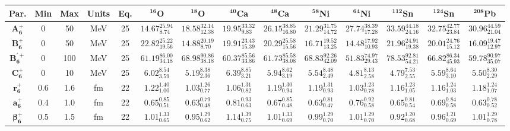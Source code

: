 \bgroup
\def\arraystretch{1.5}%
\begin{tabular}{ c c c c c c c c c c c c c c} 
\textbf{Par.} & \textbf{Min} & \textbf{Max} &                \textbf{Units} & \textbf{Eq.}& \textbf{$\mathbf{^{16}}$O}& \textbf{$\mathbf{^{18}}$O}& \textbf{$\mathbf{^{40}}$Ca}& \textbf{$\mathbf{^{48}}$Ca}& \textbf{$\mathbf{^{58}}$Ni}& \textbf{$\mathbf{^{64}}$Ni}& \textbf{$\mathbf{^{112}}$Sn}& \textbf{$\mathbf{^{124}}$Sn}& \textbf{$\mathbf{^{208}}$Pb}\\
 \hline 
$\mathbf{A_{6}^{+}}$ & 0 & 50 & MeV & 25 & $14.67^{25.94}_{8.74}$ & $18.58^{32.14}_{12.38}$ & $19.95^{33.32}_{9.83}$ & $26.15^{38.85}_{16.80}$ & $21.29^{31.75}_{14.72}$ & $27.74^{38.39}_{17.28}$ & $33.59^{44.18}_{24.16}$ & $32.75^{42.77}_{23.84}$ & $30.96^{44.59}_{21.04}$\\ 
$\mathbf{B_{6}^{+}}$ & 0 & 50 & MeV & 25 & $22.82^{25.22}_{19.56}$ & $14.88^{20.19}_{8.70}$ & $19.91^{23.43}_{15.39}$ & $20.29^{25.58}_{15.56}$ & $16.71^{19.52}_{13.25}$ & $14.48^{17.92}_{10.93}$ & $21.96^{24.91}_{19.38}$ & $20.01^{24.76}_{15.12}$ & $16.09^{19.47}_{12.97}$\\ 
$\mathbf{B_{6}^{'+}}$ & 0 & 100 & MeV & 25 & $61.19^{86.00}_{34.18}$ & $68.98^{90.86}_{38.18}$ & $60.37^{85.56}_{33.86}$ & $61.73^{85.58}_{38.08}$ & $68.83^{92.26}_{42.09}$ & $51.83^{74.97}_{29.43}$ & $78.53^{92.81}_{54.21}$ & $66.82^{86.34}_{45.93}$ & $59.78^{90.97}_{35.07}$\\ 
$\mathbf{C_{6}^{+}}$ & 0 & 10 & MeV & 25 & $6.02^{8.54}_{3.59}$ & $5.19^{8.38}_{2.36}$ & $6.39^{8.85}_{3.21}$ & $5.94^{8.62}_{3.19}$ & $5.54^{8.48}_{2.49}$ & $4.81^{8.13}_{2.58}$ & $4.79^{7.53}_{2.55}$ & $5.59^{8.64}_{3.10}$ & $5.50^{8.30}_{2.29}$\\ 
$\mathbf{r_{6}^{+}}$ & 0.6 & 1.6 & fm & 22 & $1.22^{1.40}_{1.00}$ & $1.03^{1.26}_{0.77}$ & $1.06^{1.31}_{0.82}$ & $1.19^{1.30}_{0.94}$ & $1.19^{1.31}_{0.93}$ & $1.03^{1.23}_{0.78}$ & $1.16^{1.23}_{1.05}$ & $1.16^{1.24}_{1.03}$ & $1.18^{1.24}_{1.07}$\\ 
$\mathbf{a_{6}^{+}}$ & 0.4 & 1.0 & fm & 22 & $0.65^{0.85}_{0.51}$ & $0.63^{0.79}_{0.48}$ & $0.81^{0.93}_{0.63}$ & $0.67^{0.85}_{0.48}$ & $0.63^{0.81}_{0.47}$ & $0.76^{0.92}_{0.58}$ & $0.65^{0.81}_{0.54}$ & $0.69^{0.84}_{0.58}$ & $0.63^{0.78}_{0.52}$\\ 
$\mathbf{\beta_{6}^{+}}$ & 0.5 & 1.5 & fm & 22 & $1.01^{1.33}_{0.65}$ & $0.95^{1.29}_{0.62}$ & $1.14^{1.39}_{0.75}$ & $1.01^{1.33}_{0.69}$ & $0.99^{1.29}_{0.70}$ & $1.01^{1.29}_{0.70}$ & $0.92^{1.20}_{0.68}$ & $0.96^{1.21}_{0.69}$ & $1.01^{1.29}_{0.78}$\\ 

\end{tabular}
